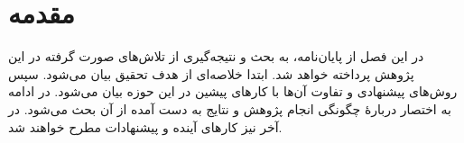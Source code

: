 \section{مقدمه}

در این فصل از پایان‌نامه، به بحث و نتیجه‌گیری از تلاش‌های صورت گرفته در این پژوهش پرداخته خواهد شد. ابتدا خلاصه‌ای از هدف تحقیق بیان می‌شود. سپس روش‌های پیشنهادی و تفاوت آن‌ها با کارهای پیشین در این حوزه بیان می‌شود. در ادامه به اختصار دربارهٔ چگونگی انجام پژوهش و نتایج به دست آمده از آن بحث می‌شود. در آخر نیز کارهای آینده و پیشنهادات مطرح خواهند شد.
